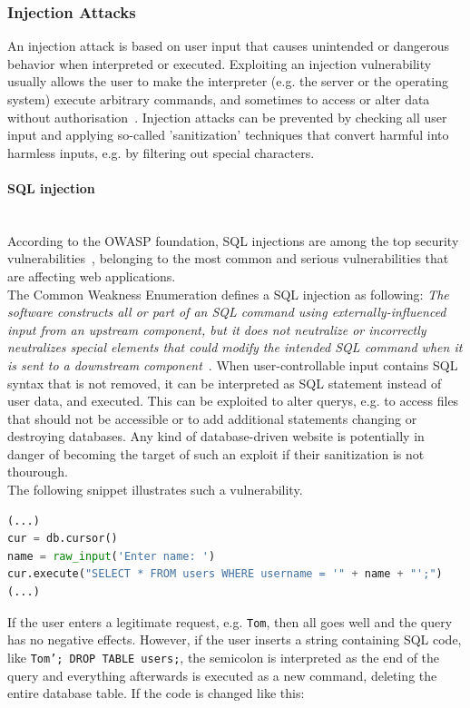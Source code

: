 \documentclass[
	a4paper,
	pagesize,
	pdftex,
	12pt,
	twoside, %
	BCOR=5mm, %
	ngerman,
	fleqn,
	final,
	]{scrartcl}
\begin{document}
\subsubsection{Injection Attacks}
An injection attack is based on user input that causes unintended or dangerous behavior when interpreted or executed. Exploiting an injection vulnerability usually allows the user to make the interpreter (e.g. the server or the operating system) execute arbitrary commands, and sometimes to access or alter data without authorisation~\cite{Micheelsen.2016}. Injection attacks can be prevented by checking all user input and applying so-called 'sanitization' techniques that convert harmful into harmless inputs, e.g. by filtering out special characters. 
\paragraph{SQL injection}\mbox{}\\
According to the OWASP foundation, SQL injections are among the top security vulnerabilities~\cite{OWASPFoundation.}, belonging to the most common and serious vulnerabilities that are affecting web applications.\\ 
The Common Weakness Enumeration defines a SQL injection as following: \textit{The software constructs all or part of an SQL command using externally-influenced input from an upstream component, but it does not neutralize or incorrectly neutralizes special elements that could modify the intended SQL command when it is sent to a downstream component}~\cite{CommonWeaknessEnumeration.19.9.2019}. When user-controllable input contains SQL syntax that is not removed, it can be interpreted as SQL statement instead of user data, and executed. This can be exploited to alter querys, e.g. to access files that should not be accessible or to add additional statements changing or destroying databases. Any kind of database-driven website is potentially in danger of becoming the target of such an exploit if their sanitization is not thourough.\\
The following snippet illustrates such a vulnerability.
\begin{lstlisting}[language=Python,showstringspaces=false]
(...)
cur = db.cursor()
name = raw_input('Enter name: ')
cur.execute("SELECT * FROM users WHERE username = '" + name + "';")
(...)
\end{lstlisting}
If the user enters a legitimate request, e.g. \texttt{Tom}, then all goes well and the query has no negative effects. However, if the user inserts a string containing SQL code, like \texttt{Tom'; DROP TABLE users;}, the semicolon is interpreted as the end of the query and everything afterwards is executed as a new command, deleting the entire database table. If the code is changed like this:
\end{document}
